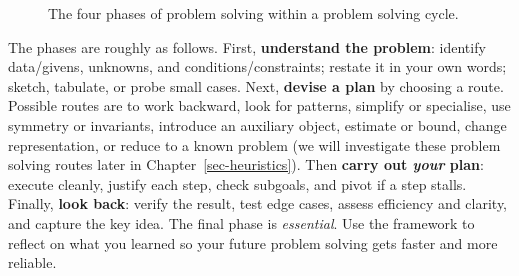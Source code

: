 \documentclass[
  a4paper,
  DIV=11,
  numbers=noendperiod,
  oneside]{scrreprt}
\begin{document}
\begin{figure}


\caption{\label{fig-phases}The four phases of problem solving within a
problem solving cycle.}

\end{figure}%

The phases are roughly as follows. First, \textbf{understand the
problem}: identify data/givens, unknowns, and conditions/constraints;
restate it in your own words; sketch, tabulate, or probe small cases.
Next, \textbf{devise a plan} by choosing a route. Possible routes are to
work backward, look for patterns, simplify or specialise, use symmetry
or invariants, introduce an auxiliary object, estimate or bound, change
representation, or reduce to a known problem (we will investigate these
problem solving routes later in Chapter~\ref{sec-heuristics}). Then
\textbf{carry out \emph{your} plan}: execute cleanly, justify each step,
check subgoals, and pivot if a step stalls. Finally, \textbf{look back}:
verify the result, test edge cases, assess efficiency and clarity, and
capture the key idea. The final phase is \emph{essential}. Use the
framework to reflect on what you learned so your future problem solving
gets faster and more reliable.
\end{document}
